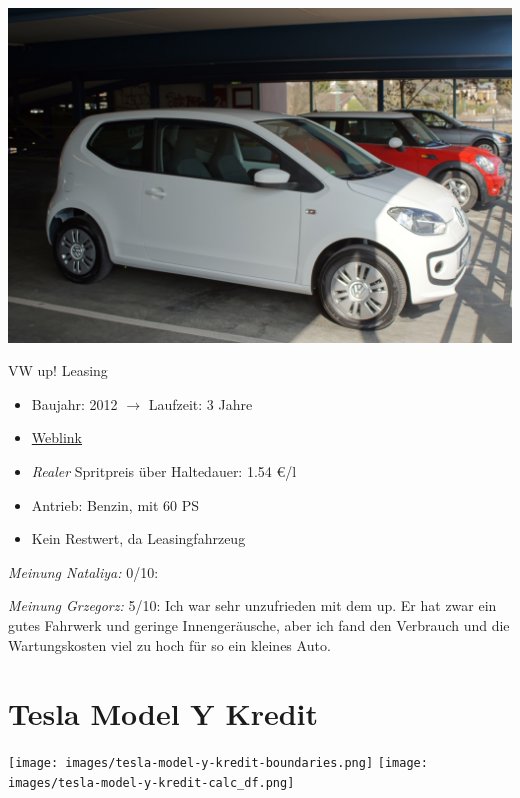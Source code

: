 \documentclass[landscape, DIV=99, 14pt]{scrartcl}
\begin{document}
\pagebreak
\begin{center}
\includegraphics[width=0.9\columnwidth]{cars/vw-up.jpg}

VW up! Leasing
\end{center}

\begin{itemize}
    \item Baujahr: 2012 $\rightarrow$ Laufzeit: 3 Jahre
    \item \href{https://www.volkswagen.de/de/modelle/up.html}{Weblink}
    \item \emph{Realer} Spritpreis \"uber Haltedauer: 1.54 \euro{}/l
    \item Antrieb: Benzin, mit 60 PS
    \item Kein Restwert, da Leasingfahrzeug
\end{itemize}

\begin{small}
\emph{Meinung Nataliya:} 0/10: 
        
\emph{Meinung Grzegorz:} 5/10: Ich war sehr unzufrieden mit dem up. Er hat zwar ein gutes Fahrwerk und geringe Innenger\"ausche, aber ich fand den Verbrauch und die Wartungskosten viel zu hoch f\"ur so ein kleines Auto.
\end{small}

\pagebreak


\twocolumn

\section*{Tesla Model Y Kredit}
\begin{center}
\texttt{[image: images/tesla-model-y-kredit-boundaries.png]}
\null
\vspace{0.5cm}
\texttt{[image: images/tesla-model-y-kredit-calc\_df.png]}
\end{center}
\end{document}
